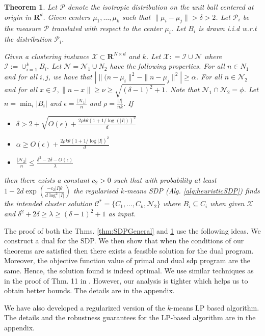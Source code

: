 \documentclass[12pt]{article}
\newcommand{\mc}{\mathcal}
\newcommand{\mb}{\mathbf}
\newtheorem{theorem}{Theorem}
\begin{document}
\begin{theorem}
\label{thm:regularizedSDPGeneral}
Let $\mc P$ denote the isotropic distribution on the unit ball centered at origin in $\mb R^d$. Given centers $\mu_1, \ldots, \mu_k$ such that $\|\mu_i - \mu_j\| > \delta > 2$. Let $\mc P_i$ be the measure $\mc P$ translated with respect to the center $\mu_i$. Let $B_i$ is drawn i.i.d w.r.t the distribution $\mc P_i$. 

Given a clustering instance $\mc X \subset \mb R^{N \times d}$ and $k$. Let $\mc X : = \mc I \cup \mc N$ where $\mc I := \cup_{i=1}^k B_i$. Let $\mc N = \mc N_1 \cup N_2$ have the following properties. For all $n \in N_1$ and for all $i, j$, we have that $| \|(n-\mu_i\|^2 - \|n-\mu_j\|^2| \ge \alpha$. For all $n \in \mc N_2$ and for all $x \in \mc I, \|n- x\| \ge \nu \ge \sqrt{(\delta-1)^2+1}$. Note that $\mc N_1 \cap \mc N_2 = \phi$. Let $n = \min_i |B_i|$ and $\epsilon = \frac{|\mc N_1|}{n}$ and $\rho = \frac{|I|}{nk}$. If  

\begin{itemize}
  \item $\delta > 2 + \sqrt{ O(\epsilon) + \frac{2\rho k\theta(1+1/\log(|I|))^2}{d}}$ 
  \item $\alpha \ge O(\epsilon)+ \frac{2\rho k\theta(1+1/\log|I|)^2}{d}$ 
  \item $\frac{|\mc N_2|}{n} \le \frac{\delta^2-2\delta-O(\epsilon)}{\lambda}$
\end{itemize}
then there exists a constant $c_2 > 0$ such that with probability at least $1 - 2d\exp(\frac{-c_2|I|\theta}{d\log^2|I|})$ the regularised $k$-means SDP (Alg. \ref{alg:heuristicSDP}) finds the intended cluster solution  $\mc C^* = \{C_1, \ldots, C_k, \mc N_2\}$ where $B_i \subseteq C_i$ when given $\mc X$ and $\delta^2+2\delta \ge \lambda \ge (\delta-1)^2 + 1$ as input.
\end{theorem}

The proof of both the Thms. \ref{thm:SDPGeneral} and \ref{thm:regularizedSDPGeneral} use the following ideas. We construct a dual for the SDP. We then show that when the conditions of our theorems are satisfied then there exists a feasible solution for the dual program. Moreover, the objective function value of primal and dual sdp program are the same. Hence, the solution found is indeed optimal. We use similar techniques as in the proof of Thm. 11 in \cite{awasthi2015relax}. However, our analysis is tighter which helps us to obtain better bounds. The details are in the appendix.

We have also developed a regularized version of the $k$-means LP based algorithm. The details and the robustness guarantees for the LP-based algorithm are in the appendix. 
\end{document}
